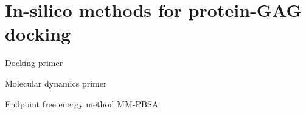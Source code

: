 \chapter{In-silico methods for protein-GAG docking}

Docking primer

Molecular dynamics primer

Endpoint free energy method MM-PBSA

\label{methods:mmpbsa_mmgbsa}

\lipsum[1-10]